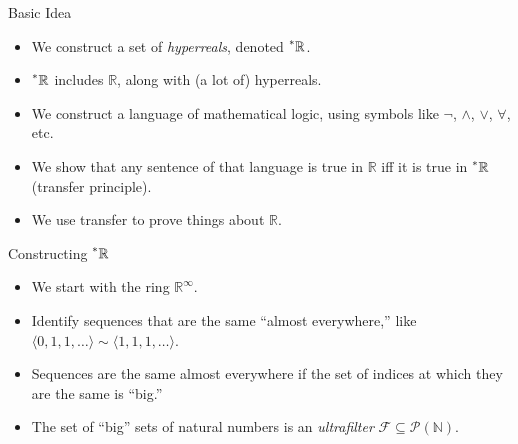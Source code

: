 \documentclass{beamer}
\theoremstyle{plain}
\theoremstyle{definition}
\newcommand{\reals}{\mathbb{R}}
\newcommand{\hreals}{\prescript{*}{}{\mathbb{R}}}
\begin{document}
\begin{frame}{Basic Idea}
\begin{itemize}
\setlength{\itemsep}{8pt}
	\item We construct a set of \textit{hyperreals}, denoted $\hreals$.
	\item $\hreals$ includes $\reals$, along with (a lot of) hyperreals.
	\item We construct a language of mathematical logic, using symbols like $\neg$, $\land$, $\lor$, $\forall$, etc.
	\item We show that any sentence of that language is true in $\reals$ iff it is true in $\hreals$ (transfer principle).
	\item We use transfer to prove things about $\reals$.
\end{itemize}
\end{frame}

\begin{frame}{Constructing $\hreals$}
\begin{itemize}
\setlength{\itemsep}{8pt}
	\item We start with the ring $\reals^\infty$.
	\item Identify sequences that are the same ``almost everywhere,'' like $\langle 0, 1, 1, \ldots \rangle \sim \langle 1, 1, 1, \ldots \rangle$.
	\item Sequences are the same almost everywhere if the set of indices at which they are the same is ``big.''
	\item The set of ``big'' sets of natural numbers is an \textit{ultrafilter} $\mathcal{F} \subseteq \mathcal{P}(\mathbb{N})$.
\end{itemize}
\end{frame}
\end{document}
